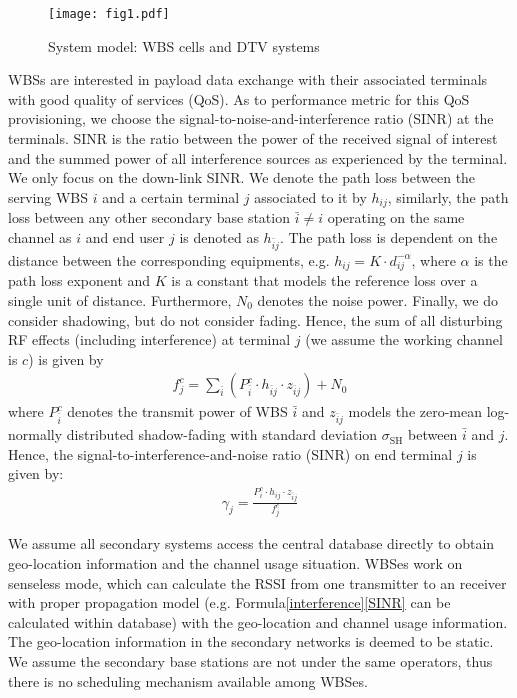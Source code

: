 \begin{figure}[h!]
  \centering
  \texttt{[image: fig1.pdf]}
  \caption{System model: WBS cells and DTV systems}
\label{sysmodel}
\end{figure}

WBSs are interested in payload data exchange with their associated terminals with good quality of services (QoS). As to performance metric for this QoS provisioning, we choose the signal-to-noise-and-interference ratio (SINR) at the terminals. SINR is the ratio between the power of the received signal of interest and the summed power of all interference sources as experienced by the terminal. We only focus on the down-link SINR. We denote the path loss between the serving WBS $i$ and a certain terminal $j$ associated to it by $h_{ij}$, similarly, the path loss between any other secondary base station $\bar{i} \neq i$ operating on the same channel as $i$ and end user $j$ is denoted as $h_{\bar{i}j}$. The path loss is dependent on the distance between the corresponding equipments, e.g. $h_{ij}=K \cdot d_{ij}^{-\alpha}$, where $\alpha$ is the path loss exponent and $K$ is a constant that models the reference loss over a single unit of distance.  Furthermore,  $N_0$ denotes the noise power. Finally, we do consider shadowing, but do not consider fading. Hence, the sum of all disturbing RF effects (including interference) at terminal $j$ (we assume the working channel is $c$) is given by 
\begin{equation}
\label{interference}
\begin{aligned}
f_j^c=\sum_{\bar{i}} (P_{\bar{i}}^c \cdot h_{\bar{i}j} \cdot z_{\bar{i}j}) +  N_0
\end{aligned}
\end{equation}
where $P_{\bar{i}}^c$ denotes the transmit power of WBS $\bar{i}$ and $z_{\bar{i}j}$ models the zero-mean log-normally distributed shadow-fading with standard deviation $\sigma_{\text{SH}}$ between $\bar{i}$ and $j$.
Hence, the signal-to-interference-and-noise ratio (SINR) on end terminal $j$ is given by:
\begin{equation}
\label{SINR}
\begin{aligned}
\gamma_{j} = \frac{P_{i}^c \cdot h_{ij}\cdot z_{\bar{i}j}} {f_j^c}
\end{aligned}
\end{equation}	


We assume all secondary systems access the central database directly to obtain geo-location information and the channel usage situation. 
WBSes work on senseless mode, which can calculate the RSSI from one transmitter to an receiver with proper propagation model (e.g. Formula\ref{interference}\ref{SINR} can be calculated within database) with the geo-location and channel usage information. 
The geo-location information in the secondary networks is deemed to be static.
We assume the secondary base stations are not under the same operators, thus there is no scheduling mechanism available among WBSes.

